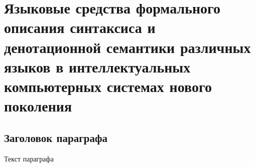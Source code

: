\chapter{Языковые средства формального описания синтаксиса и денотационной семантики различных языков в интеллектуальных компьютерных системах нового поколения}
\label{chapter_lang}


\section{Заголовок параграфа}
Текст параграфа

%